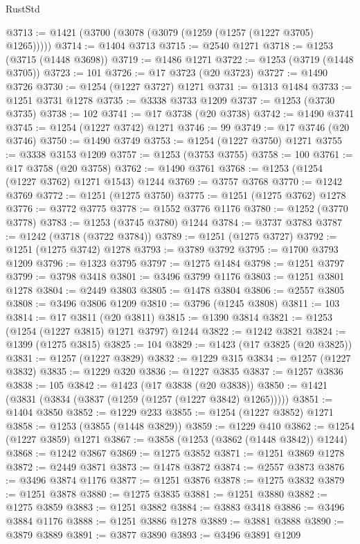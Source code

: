 \begin{lexlean}{RustStd}
\begin{coremodule}
@3713 := @1421 (@3700 (@3078 (@3079 (@1259 (@1257 (@1227 @3705) @1265)))))
@3714 := @1404 @3713
@3715 := @2540 @1271
@3718 := @1253 (@3715 (@1448 @3698))
@3719 := @1486 @1271
@3722 := @1253 (@3719 (@1448 @3705))
@3723 := 101
@3726 := @17 @3723 (@20 @3723)
@3727 := @1490 @3726
@3730 := @1254 (@1227 @3727) @1271
@3731 := @1313 @1484
@3733 := @1251 @3731 @1278
@3735 := @3338 @3733 @1209
@3737 := @1253 (@3730 @3735)
@3738 := 102
@3741 := @17 @3738 (@20 @3738)
@3742 := @1490 @3741
@3745 := @1254 (@1227 @3742) @1271
@3746 := 99
@3749 := @17 @3746 (@20 @3746)
@3750 := @1490 @3749
@3753 := @1254 (@1227 @3750) @1271
@3755 := @3338 @3153 @1209
@3757 := @1253 (@3753 @3755)
@3758 := 100
@3761 := @17 @3758 (@20 @3758)
@3762 := @1490 @3761
@3768 := @1253 (@1254 (@1227 @3762) @1271 @1543) @1244
@3769 := @3757 @3768
@3770 := @1242 @3769
@3772 := @1251 (@1275 @3750)
@3775 := @1251 (@1275 @3762) @1278
@3776 := @3772 @3775
@3778 := @1552 @3776 @1176
@3780 := @1252 (@3770 @3778)
@3783 := @1253 (@3745 @3780) @1244
@3784 := @3737 @3783
@3787 := @1242 (@3718 (@3722 @3784))
@3789 := @1251 (@1275 @3727)
@3792 := @1251 (@1275 @3742) @1278
@3793 := @3789 @3792
@3795 := @1700 @3793 @1209
@3796 := @1323 @3795
@3797 := @1275 @1484
@3798 := @1251 @3797
@3799 := @3798 @3418
@3801 := @3496 @3799 @1176
@3803 := @1251 @3801 @1278
@3804 := @2449 @3803
@3805 := @1478 @3804
@3806 := @2557 @3805
@3808 := @3496 @3806 @1209
@3810 := @3796 (@1245 @3808)
@3811 := 103
@3814 := @17 @3811 (@20 @3811)
@3815 := @1390 @3814
@3821 := @1253 (@1254 (@1227 @3815) @1271 @3797) @1244
@3822 := @1242 @3821
@3824 := @1399 (@1275 @3815)
@3825 := 104
@3829 := @1423 (@17 @3825 (@20 @3825))
@3831 := @1257 (@1227 @3829)
@3832 := @1229 @315
@3834 := @1257 (@1227 @3832)
@3835 := @1229 @320
@3836 := @1227 @3835
@3837 := @1257 @3836
@3838 := 105
@3842 := @1423 (@17 @3838 (@20 @3838))
@3850 := @1421 (@3831 (@3834 (@3837 (@1259 (@1257 (@1227 @3842) @1265)))))
@3851 := @1404 @3850
@3852 := @1229 @233
@3855 := @1254 (@1227 @3852) @1271
@3858 := @1253 (@3855 (@1448 @3829))
@3859 := @1229 @410
@3862 := @1254 (@1227 @3859) @1271
@3867 := @3858 (@1253 (@3862 (@1448 @3842)) @1244)
@3868 := @1242 @3867
@3869 := @1275 @3852
@3871 := @1251 @3869 @1278
@3872 := @2449 @3871
@3873 := @1478 @3872
@3874 := @2557 @3873
@3876 := @3496 @3874 @1176
@3877 := @1251 @3876
@3878 := @1275 @3832
@3879 := @1251 @3878
@3880 := @1275 @3835
@3881 := @1251 @3880
@3882 := @1275 @3859
@3883 := @1251 @3882
@3884 := @3883 @3418
@3886 := @3496 @3884 @1176
@3888 := @1251 @3886 @1278
@3889 := @3881 @3888
@3890 := @3879 @3889
@3891 := @3877 @3890
@3893 := @3496 @3891 @1209

\end{coremodule}
\end{lexlean}

